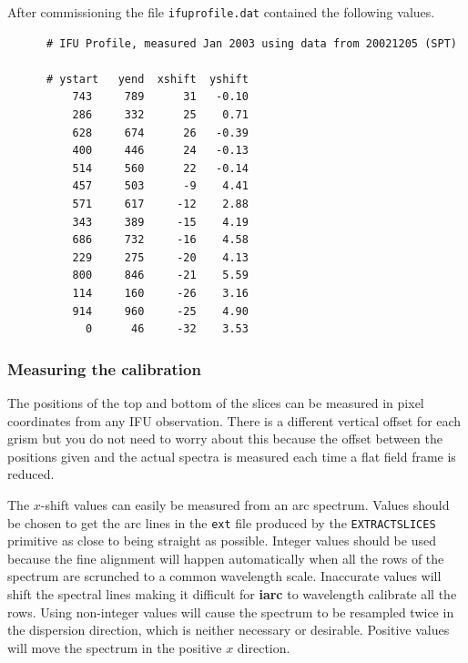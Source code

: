 \documentclass[twoside,11pt]{article}
\newcommand{\xref}[3]{#1}
\renewcommand{\_}{\texttt{\symbol{95}}}
\begin{document}
After commissioning the file {\tt ifu\_profile.dat} contained the
following values.

\begin{verbatim}
      # IFU Profile, measured Jan 2003 using data from 20021205 (SPT)

      # ystart   yend  xshift  yshift 
          743     789      31   -0.10
          286     332      25    0.71
          628     674      26   -0.39
          400     446      24   -0.13
          514     560      22   -0.14
          457     503      -9    4.41
          571     617     -12    2.88
          343     389     -15    4.19
          686     732     -16    4.58
          229     275     -20    4.13
          800     846     -21    5.59
          114     160     -26    3.16
          914     960     -25    4.90
            0      46     -32    3.53
\end{verbatim}


\subsubsection{Measuring the calibration}

The positions of the top and bottom of the slices can be measured in
pixel coordinates from any IFU observation. There is a different
vertical offset for each grism but you do not need to worry about
this because the offset between the positions given and the actual
spectra is measured each time a flat field frame is reduced. 

The $x$-shift values can easily be measured from an arc spectrum.
Values should be chosen to get the arc lines in the {\tt \_ext} file
produced by the {\tt \_EXTRACT\_SLICES\_} primitive as close to being
straight as possible. Integer values should be used because the fine
alignment will happen automatically when all the rows of the spectrum
are scrunched to a common wavelength scale. Inaccurate values will
shift the spectral lines making it difficult for \xref{{\bf
    iarc}}{sun86}{IARC} to wavelength calibrate all the rows.  Using
non-integer values will cause the spectrum to be resampled twice in
the dispersion direction, which is neither necessary or desirable.
Positive values will move the spectrum in the positive $x$ direction.
\end{document}
